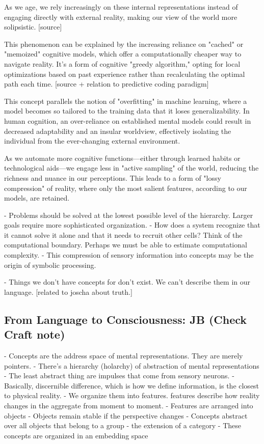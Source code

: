 As we age, we rely increasingly on these internal representations instead of engaging directly with external reality, making our view of the world more solipsistic. [source]


This phenomenon can be explained by the increasing reliance on "cached" or "memoized" cognitive models, which offer a computationally cheaper way to navigate reality. It's a form of cognitive "greedy algorithm," opting for local optimizations based on past experience rather than recalculating the optimal path each time. [source + relation to predictive coding paradigm]

This concept parallels the notion of "overfitting" in machine learning, where a model becomes so tailored to the training data that it loses generalizability. In human cognition, an over-reliance on established mental models could result in decreased adaptability and an insular worldview, effectively isolating the individual from the ever-changing external environment.

As we automate more cognitive functions—either through learned habits or technological aids—we engage less in "active sampling" of the world, reducing the richness and nuance in our perceptions. This leads to a form of "lossy compression" of reality, where only the most salient features, according to our models, are retained.


- Problems should be solved at the lowest possible level of the hierarchy. Larger goals require more sophisticated organization.
- How does a system recognize that it cannot solve it alone and that it needs to recruit other cells? Think of the computational boundary. Perhaps we must be able to estimate computational complexity. 
- This compression of sensory information into concepts may be the origin of symbolic processing. 

- Things we don't have concepts for don't exist. We can't describe them in our language. [related to joscha about truth.] 



\subsection{From Language to Consciousness: JB (Check Craft note)}
- Concepts are the address space of mental representations. They are merely pointers. 
- There's a hierarchy (holarchy) of abstraction of mental representations
- The least abstract thing are impulses that come from sensory neurons. 
- Basically, discernible difference, which is how we define information, is the closest to physical reality.
- We organize them into features. features describe how reality changes in the aggregate from moment to moment.
- Features are arranged into objects
- Objects remain stable if the perspective changes
- Concepts abstract over all objects that belong to a group - the extension of a category
- These concepts are organized in an embedding space

